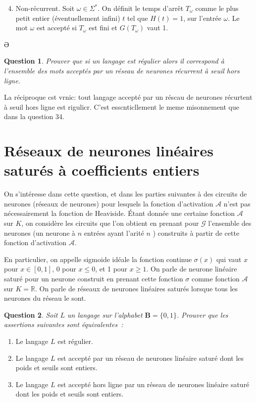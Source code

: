 \documentclass[10pt]{article}
\newtheorem{question}{Question}
\begin{document}
\begin{enumerate}
  \setcounter{enumi}{3}
  \item Non-récurrent. Soit $\omega \in Σ^{*}$. On définit le temps d'arrêt $T_{\omega}$ comme le plus petit entier (éventuellement infini) $t$ tel que $H(t)=1$, sur l'entrée $\omega$. Le mot $\omega$ est accepté si $T_{\omega}$ est fini et $G\left(T_{\omega}\right)$ vaut 1.
\end{enumerate}

Ә \begin{question}
	Prouver que si un langage est régulier alors il correspond à l'ensemble des mots acceptés par un réseau de neurones récurrent à seuil hors ligne.
\end{question}

La réciproque cst vrnic: tout langage accepté par un réscau de neurones récurtent à seuil hors ligne est rigulicr. C'est esscnticllement le meme misonnement que dans la question 34.

\section{Réseaux de neurones linéaires saturés à coefficients entiers}
On s'intéresse dans cette question, et dans les parties suivantes à des circuits de neurones (réseaux de neurones) pour lesquels la fonction d'activation $\mathcal{A}$ n'est pas nécessairement la fonction de Heaviside. Étant donnée une certaine fonction $\mathcal{A}$ sur $K$, on considère les circuits que l'on obtient en prenant pour $\mathcal{G}$ l'ensemble des neurones (un neurone à $n$ entrées ayant l'arité $n$ ) construits à partir de cette fonction d'activation $\mathcal{A}$.

En particulier, on appelle sigmoide idéale la fonction continue $\sigma(x)$ qui vaut $x$ pour $x \in[0,1]$, 0 pour $x ≤ 0$, et 1 pour $x ≥ 1$. On parle de neurone linéaire saturé pour un neurone construit en prenant cette fonction $\sigma$ comme fonction $\mathcal{A}$ sur $K=ℝ$. On parle de réseaux de neurones linéaires saturés lorsque tous les neurones du réseau le sont.

\begin{question}
	Soit $L$ un langage sur l'alphabet $\mathbf{B}=\{0,1\}$. Prouver que les assertions suivantes sont équivalentes :
\end{question}

\begin{enumerate}
  \item Le langage $L$ est régulier.

  \item Le langage $L$ est accepté par un réseau de neurones linéaire saturé dont les poids et seuils sont entiers.

  \item Le langage $L$ est accepté hors ligne par un réseau de neurones linéaire saturé dont les poids et seuils sont entiers.

\end{enumerate}
\end{document}
